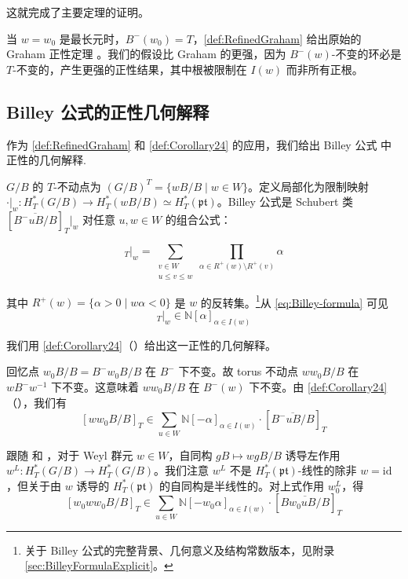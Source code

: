 这就完成了主要定理的证明。


\begin{Remark}
当 $w = w_0$ 是最长元时，$B^-(w_0) = T$，\cref{def:RefinedGraham} 给出原始的 Graham 正性定理 \cite{Gr}。我们的假设比 Graham 的更强，因为 $B^-(w)$-不变的环必是 $T$-不变的，产生更强的正性结果，其中根被限制在 $I(w)$ 而非所有正根。
\end{Remark}

\subsection{Billey 公式的正性几何解释}
\label{sec:BilleyPositivity}

作为 \cref{def:RefinedGraham} 和 \cref{def:Corollary24} 的应用，我们给出 Billey 公式 \cite{billey1999} 中正性的几何解释.

$G/B$ 的 $T$-不动点为 $(G/B)^T = \{wB/B \mid w \in W\}$。定义局部化为限制映射 $\cdot|_w : H_T^*(G/B) \to H_T^*(wB/B) \simeq H_T^*(\mathfrak{pt})$。Billey 公式是 Schubert 类 $[\overline{B^-uB/B}]_T|_w$ 对任意 $u, w \in W$ 的组合公式：

\begin{equation}
[\overline{B^-uB/B}]_T|_w = \sum_{\substack{v \in W \\ u \leq v \leq w}} \prod_{\alpha \in R^+(w) \setminus R^+(v)} \alpha
\label{eq:Billey-formula}
\end{equation}

其中 $R^+(w) = \{\alpha > 0 \mid w\alpha < 0\}$ 是 $w$ 的反转集。\footnote{关于 Billey 公式的完整背景、几何意义及结构常数版本，见附录 \cref{sec:BilleyFormulaExplicit}。}从 \eqref{eq:Billey-formula} 可见
\begin{equation}
[\overline{B^-uB/B}]_T|_w \in \mathbb{N}[\alpha]_{\alpha \in I(w)} \label{eq:Billey-positivity}
\end{equation}

我们用 \cref{def:Corollary24}（\cite[Corollary 2.4]{GX2025}）给出这一正性的几何解释。

回忆点 $w_0B/B = B^-w_0B/B$ 在 $B^-$ 下不变。故 torus 不动点 $ww_0B/B$ 在 $wB^-w^{-1}$ 下不变。这意味着 $ww_0B/B$ 在 $B^-(w)$ 下不变。由 \cref{def:Corollary24}（\cite[Corollary 2.4]{GX2025}），我们有
$$[ww_0B/B]_T \in \sum_{u \in W} \mathbb{N}[-\alpha]_{\alpha \in I(w)} \cdot [\overline{B^-uB/B}]_T$$

跟随 \cite[Section 3]{mihalcea2022} 和 \cite[Section 16.5]{anderson2023}，对于 Weyl 群元 $w \in W$，自同构 $gB \mapsto wgB/B$ 诱导左作用 $w^L : H_T^*(G/B) \to H_T^*(G/B)$。我们注意 $w^L$ 不是 $H_T^*(\mathfrak{pt})$-线性的除非 $w = \text{id}$，但关于由 $w$ 诱导的 $H_T^*(\mathfrak{pt})$ 的自同构是半线性的。对上式作用 $w_0^L$，得
$$[w_0ww_0B/B]_T \in \sum_{u \in W} \mathbb{N}[-w_0\alpha]_{\alpha \in I(w)} \cdot [\overline{Bw_0uB/B}]_T$$

